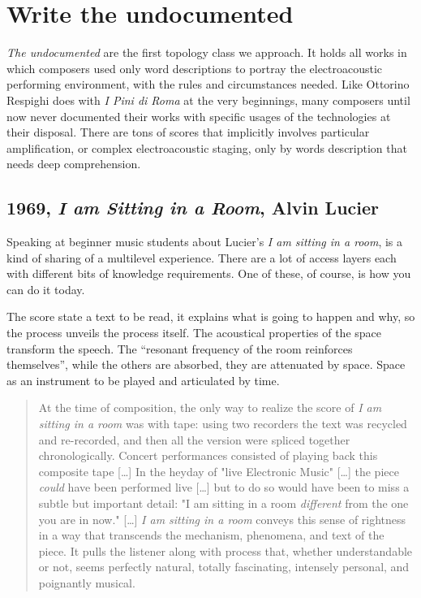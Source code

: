 \documentclass[twoside,a4paper]{article}
\begin{document}
\section{Write the undocumented}
\label{sec:writing}

\emph{The undocumented} are the first topology class we approach. It holds all
works in which composers used only word descriptions to portray the electroacoustic
performing environment, with the rules and circumstances needed. Like Ottorino
Respighi does with \emph{I Pini di Roma} \cite{ropr25} at the very beginnings,
many composers until now never documented their works with specific usages of the
technologies at their disposal. There are tons of scores that implicitly involves
particular amplification, or complex electroacoustic staging, only by words
description that needs deep comprehension.


\subsection{1969, \emph{I am Sitting in a Room}, Alvin Lucier}

Speaking at beginner music students about Lucier's \emph{I am sitting in a room},
is a kind of sharing of a multilevel experience. There are a lot of access layers
each with different bits of knowledge requirements. One of these, of course, is
how you can do it today.

The score state a text to be read, it explains what is going to happen and why,
so the process unveils the process itself. The acoustical properties of the
space transform the speech. The “resonant frequency of the room reinforces
themselves”, while the others are absorbed, they are attenuated by space. Space
as an instrument to be played and articulated by time.

\begin{quote}
At the time of composition, the only way to realize the score of \emph{I am
sitting in a room} was with tape: using two recorders the text was recycled and
re-recorded, and then all the version were spliced together chronologically.
Concert performances consisted of playing back this composite tape [\ldots] In
the heyday of "live Electronic Music" [\ldots] the piece \emph{could} have been
performed live [\ldots] but to do so would have been to miss a subtle but
important detail: "I am sitting in a room \emph{different} from the one you are
in now." [\ldots] \emph{I am sitting in a room} conveys this sense of rightness
in a way that transcends the mechanism, phenomena, and text of the piece. It
pulls the listener along with process that, whether understandable or not, seems
perfectly natural, totally fascinating, intensely personal, and poignantly
musical. \cite{alCD90}
\end{quote}
\end{document}
